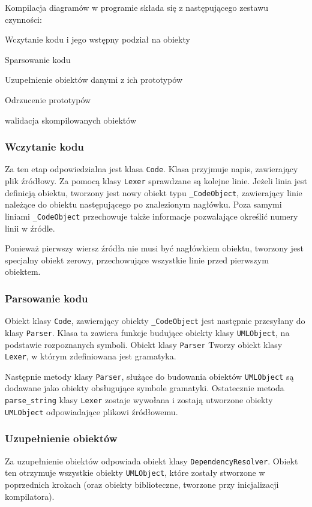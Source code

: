
Kompilacja diagramów w programie \omlet składa się z następującego zestawu czynności:

\begin{itemize*}
  \item{Wczytanie kodu i jego wstępny podział na obiekty}
  \item{Sparsowanie kodu}
  \item{Uzupełnienie obiektów danymi z ich prototypów}
  \item{Odrzucenie prototypów}
  \item{walidacja skompilowanych obiektów}
\end{itemize*}

\subsubsection{Wczytanie kodu}
Za ten etap odpowiedzialna jest klasa \texttt{Code}.
Klasa przyjmuje napis, zawierający plik źródłowy.
Za pomocą klasy \texttt{Lexer} sprawdzane są kolejne linie.
Jeżeli linia jest definicją obiektu, tworzony jest nowy obiekt typu \texttt{\_CodeObject}, zawierający linie należące do obiektu następującego po znalezionym nagłówku.
Poza samymi liniami \texttt{\_CodeObject} przechowuje także informacje pozwalające określić numery linii w źródle.

Ponieważ pierwszy wiersz źródła nie musi być nagłówkiem obiektu, tworzony jest specjalny obiekt zerowy, przechowujące wszystkie linie przed pierwszym obiektem.

\subsubsection{Parsowanie kodu}
Obiekt klasy \texttt{Code}, zawierający obiekty \texttt{\_CodeObject} jest następnie przesyłany do klasy \texttt{Parser}.
Klasa ta zawiera funkcje budujące obiekty klasy \texttt{UMLObject}, na podstawie rozpoznanych symboli.
Obiekt klasy \texttt{Parser} Tworzy obiekt klasy \texttt{Lexer}, w którym zdefiniowana jest gramatyka.

Następnie metody klasy \texttt{Parser}, służące do budowania obiektów \texttt{UMLObject} są dodawane jako obiekty obsługujące symbole gramatyki.
Ostatecznie metoda \texttt{parse\_string} klasy \texttt{Lexer} zostaje wywołana i zostają utworzone obiekty \texttt{UMLObject} odpowiadające plikowi źródłowemu.

\subsubsection{Uzupełnienie obiektów}
Za uzupełnienie obiektów odpowiada obiekt klasy \texttt{DependencyResolver}.
Obiekt ten otrzymuje wszystkie obiekty \texttt{UMLObject}, które zostały stworzone w poprzednich krokach (oraz obiekty biblioteczne, tworzone przy inicjalizacji kompilatora).


